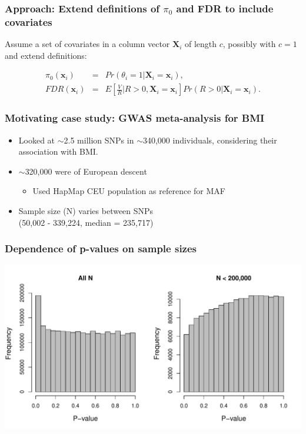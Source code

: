 \documentclass{beamer}
\newcommand{\bX}{\mathbf{X}}
\newcommand{\bx}{\mathbf{x}}
\begin{document}

\begin{frame}
\frametitle{Approach: Extend definitions of $\pi_0$ and FDR to include covariates}

Assume a set of covariates in a column vector $\bX_i$ of length $c$, possibly with $c=1$ and extend definitions:


\begin{eqnarray*}
\pi_0(\bx_i) &=& Pr(\theta_i = 1|\bX_i=\bx_i),\\
FDR(\bx_i) &=& E \left [  \frac{V}{R} \bigg| R > 0, \bX_i=\bx_i \right ] Pr(R > 0|\bX_i=\bx_i).
\end{eqnarray*}


\end{frame}


\begin{frame}
\frametitle{Motivating case study: GWAS meta-analysis for BMI}

\begin{itemize}
\item Looked at $\sim$2.5 million SNPs in $\sim$340,000 individuals, considering their association with BMI.
\vspace{0.5cm}
\item $\sim$320,000 were of European descent
\begin{itemize}
\item Used HapMap CEU population as reference for MAF
\end{itemize}
\vspace{0.5cm}
\item Sample size (N) varies between SNPs \\
(50,002 - 339,224, median = 235,717)
\end{itemize}

\end{frame}



\begin{frame}
\frametitle{Dependence of p-values on sample sizes}

\begin{center}
\includegraphics[scale=0.55]{Fig1-1.pdf} 
\end{center}

\end{frame}
\end{document}
